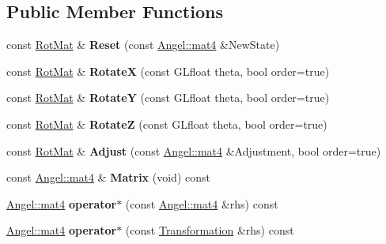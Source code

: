 \subsection*{Public Member Functions}
\begin{DoxyCompactItemize}
\item 
\hypertarget{class_rot_mat_abe1e5d870c095d4345d58d5539a3f86a}{const \hyperlink{class_rot_mat}{Rot\-Mat} \& {\bfseries Reset} (const \hyperlink{class_angel_1_1mat4}{Angel\-::mat4} \&New\-State)}\label{class_rot_mat_abe1e5d870c095d4345d58d5539a3f86a}

\item 
\hypertarget{class_rot_mat_ac6975ee8070d4477d86eb0e61482b7b6}{const \hyperlink{class_rot_mat}{Rot\-Mat} \& {\bfseries Rotate\-X} (const G\-Lfloat theta, bool order=true)}\label{class_rot_mat_ac6975ee8070d4477d86eb0e61482b7b6}

\item 
\hypertarget{class_rot_mat_a49c0d0cb066fd400bc51f1bd7822d36e}{const \hyperlink{class_rot_mat}{Rot\-Mat} \& {\bfseries Rotate\-Y} (const G\-Lfloat theta, bool order=true)}\label{class_rot_mat_a49c0d0cb066fd400bc51f1bd7822d36e}

\item 
\hypertarget{class_rot_mat_a04e786ea267f55f2b11f722f980e1440}{const \hyperlink{class_rot_mat}{Rot\-Mat} \& {\bfseries Rotate\-Z} (const G\-Lfloat theta, bool order=true)}\label{class_rot_mat_a04e786ea267f55f2b11f722f980e1440}

\item 
\hypertarget{class_rot_mat_a415534929361d6d78800aa7f4da2e6c7}{const \hyperlink{class_rot_mat}{Rot\-Mat} \& {\bfseries Adjust} (const \hyperlink{class_angel_1_1mat4}{Angel\-::mat4} \&Adjustment, bool order=true)}\label{class_rot_mat_a415534929361d6d78800aa7f4da2e6c7}

\item 
\hypertarget{class_transformation_ae6a57a1ee74ca1da1b8aef3d328a8772}{const \hyperlink{class_angel_1_1mat4}{Angel\-::mat4} \& {\bfseries Matrix} (void) const }\label{class_transformation_ae6a57a1ee74ca1da1b8aef3d328a8772}

\item 
\hypertarget{class_transformation_afdfbf48815a5b0d885f3b93f04cd2c66}{\hyperlink{class_angel_1_1mat4}{Angel\-::mat4} {\bfseries operator$\ast$} (const \hyperlink{class_angel_1_1mat4}{Angel\-::mat4} \&rhs) const }\label{class_transformation_afdfbf48815a5b0d885f3b93f04cd2c66}

\item 
\hypertarget{class_transformation_a85b923e0066365ef2e4aec3671396410}{\hyperlink{class_angel_1_1mat4}{Angel\-::mat4} {\bfseries operator$\ast$} (const \hyperlink{class_transformation}{Transformation} \&rhs) const }\label{class_transformation_a85b923e0066365ef2e4aec3671396410}

\end{DoxyCompactItemize}
